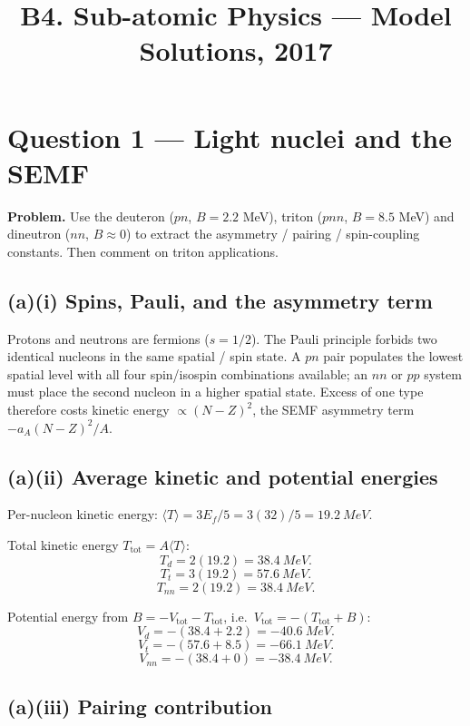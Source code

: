 \documentclass[11pt]{article}
\title{B4. Sub-atomic Physics --- Model Solutions, 2017}
\author{}
\date{}
\begin{document}
\maketitle

\section*{Question 1 --- Light nuclei and the SEMF}

\textbf{Problem.} Use the deuteron ($pn$, $B=2.2$ MeV), triton ($pnn$, $B=8.5$ MeV) and dineutron ($nn$, $B\approx 0$) to extract the asymmetry / pairing / spin-coupling constants. Then comment on triton applications.

\subsection*{(a)(i) Spins, Pauli, and the asymmetry term}

Protons and neutrons are fermions ($s=1/2$). The Pauli principle forbids two identical nucleons in the same spatial / spin state. A $pn$ pair populates the lowest spatial level with all four spin/isospin combinations available; an $nn$ or $pp$ system must place the second nucleon in a higher spatial state. Excess of one type therefore costs kinetic energy $\propto (N-Z)^2$, the SEMF asymmetry term $-a_A(N-Z)^2/A$.

\subsection*{(a)(ii) Average kinetic and potential energies}

Per-nucleon kinetic energy: $\langle T\rangle = 3E_f/5 = 3(32)/5 = \SI{19.2}{MeV}$.

Total kinetic energy $T_\text{tot}=A\langle T\rangle$:
\[ T_d = 2(19.2) = \SI{38.4}{MeV}. \]
\[ T_t = 3(19.2) = \SI{57.6}{MeV}. \]
\[ T_{nn} = 2(19.2) = \SI{38.4}{MeV}. \]

Potential energy from $B = -V_\text{tot} - T_\text{tot}$, i.e.\ $V_\text{tot}=-(T_\text{tot}+B)$:
\[ V_d = -(38.4+2.2) = \SI{-40.6}{MeV}. \]
\[ V_t = -(57.6+8.5) = \SI{-66.1}{MeV}. \]
\[ V_{nn} = -(38.4+0) = \SI{-38.4}{MeV}. \]

\subsection*{(a)(iii) Pairing contribution}
\end{document}
